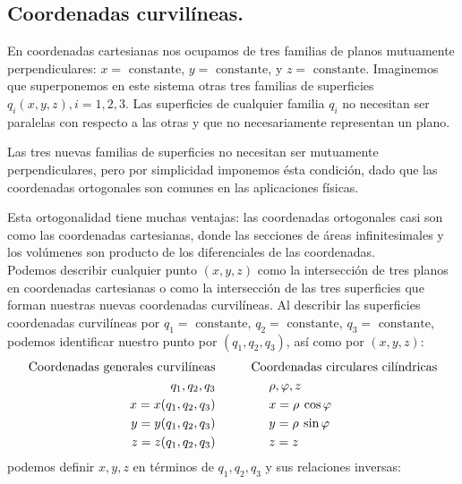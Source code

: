\subsection{Coordenadas curvilíneas.}
En coordenadas cartesianas nos ocupamos de tres familias de planos mutuamente perpendiculares: $x = \mbox{ constante}$, $y = \mbox{ constante}$, y $z = \mbox{ constante}$. Imaginemos que superponemos en este sistema otras tres familias de superficies $q_{i} (x, y, z), i = 1,2,3$. Las superficies de cualquier familia $q_{i}$ no necesitan ser paralelas con respecto a las otras  y que no necesariamente representan un plano.
\par
Las tres nuevas familias de superficies no necesitan ser mutuamente perpendiculares, pero por simplicidad imponemos ésta condición, dado que las coordenadas ortogonales son comunes en las aplicaciones físicas.
\par
Esta ortogonalidad tiene muchas ventajas: las coordenadas ortogonales casi son como las coordenadas cartesianas, donde las secciones de áreas infinitesimales y los volúmenes son producto de los diferenciales de las coordenadas.
\\
Podemos describir cualquier punto $(x, y, z)$ como la intersección de tres planos en coordenadas cartesianas o como la intersección de las tres superficies que forman nuestras nuevas coordenadas curvilíneas. Al describir las superficies coordenadas curvilíneas por $q_{1} = \mbox{ constante}$, $q_{2} = \mbox{ constante}$, $q_{3} = \mbox{ constante}$, podemos identificar nuestro punto por $(q_{1}, q_{2}, q_{3})$, así como por $(x, y, z)$:
\begin{align}
\begin{aligned}
\mbox{Coordenadas  generales curvilíneas} & \hspace{1.cm} \mbox{Coordenadas circulares cilíndricas} \\
q_{1}, q_{2}, q_{3} & \hspace{1.5cm} \rho, \varphi, z \\ 
x = x(q_{1},q_{2}, q_{3}) & \hspace{1.5cm} x = \rho \: \cos \varphi \\ 
y = y(q_{1},q_{2}, q_{3}) & \hspace{1.5cm} y = \rho \: \sin \varphi \\
z = z(q_{1},q_{2}, q_{3}) & \hspace{1.5cm} z = z
\label{eq:ecuacion_02_01}
\end{aligned}
\end{align}
podemos definir $x, y, z$ en términos de $q_{1}, q_{2}, q_{3}$ y sus relaciones inversas:
